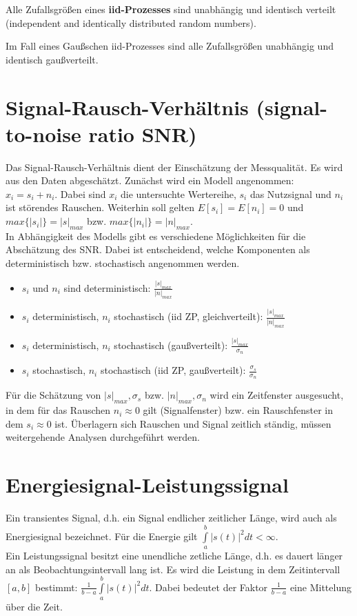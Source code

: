 Alle Zufallsgrößen eines {\bf iid-Prozesses} sind unabhängig und identisch verteilt (independent and identically distributed random numbers).

Im Fall eines Gaußschen iid-Prozesses sind alle Zufallsgrößen unabhängig und identisch gaußverteilt.

\newpage


\section{Signal-Rausch-Verhältnis (signal-to-noise ratio SNR)}
Das Signal-Rausch-Verhältnis dient der Einschätzung der Messqualität. Es wird aus den Daten abgeschätzt. Zunächst wird ein Modell angenommen:\\
$x_i=s_i + n_i.$
Dabei sind $x_i$ die untersuchte Wertereihe, $s_i$ das Nutzsignal und  $n_i$ ist störendes Rauschen.
Weiterhin soll gelten $E[s_i]=E[n_i]=0$ und $max\{|s_i|\}=|s|_{max}$ bzw. $max\{|n_i|\}=|n|_{max}$.\\
In Abhängigkeit des Modells gibt es verschiedene Möglichkeiten für die Abschätzung des SNR. Dabei ist entscheidend, welche Komponenten als deterministisch bzw. stochastisch angenommen werden.
\begin {itemize}
\item $s_i$ und $n_i$ sind deterministisch: $\frac {|s|_{max}}{|n|_{max}}$
\item $s_i$ deterministisch, $n_i$ stochastisch (iid ZP, gleichverteilt): $\frac {|s|_{max}}{|n|_{max}}$\\
\item $s_i$ deterministisch, $n_i$ stochastisch (gaußverteilt): $\frac {|s|_{max}}{\sigma_n}$\\
\item $s_i$ stochastisch, $n_i$ stochastisch (iid ZP, gaußverteilt): $\frac {\sigma_s}{\sigma_n}$\\
\end{itemize}
Für die Schätzung von $|s|_{max}, \sigma_s$ bzw. $|n|_{max}, \sigma_n$ wird ein Zeitfenster ausgesucht, in dem für das Rauschen  $n_i\approx 0$ gilt (Signalfenster) bzw. ein Rauschfenster in dem $s_i\approx 0$ ist. Überlagern sich Rauschen und Signal zeitlich ständig, müssen weitergehende Analysen durchgeführt werden.


\section{Energiesignal-Leistungssignal}
Ein transientes Signal, d.h. ein Signal endlicher zeitlicher Länge, wird auch als Energiesignal bezeichnet.  Für die Energie gilt $\int\limits_a^b |s(t)|^2 dt < \infty$.\\
Ein Leistungssignal besitzt eine unendliche zetliche Länge, d.h. es dauert länger an als Beobachtungsintervall lang ist. 
Es wird die Leistung in dem Zeitintervall $[a,b]$ bestimmt: $\frac{1}{b-a}\int\limits_a^b |s(t)|^2 dt$. Dabei bedeutet der Faktor $\frac{1}{b-a}$ eine Mittelung über die Zeit.

